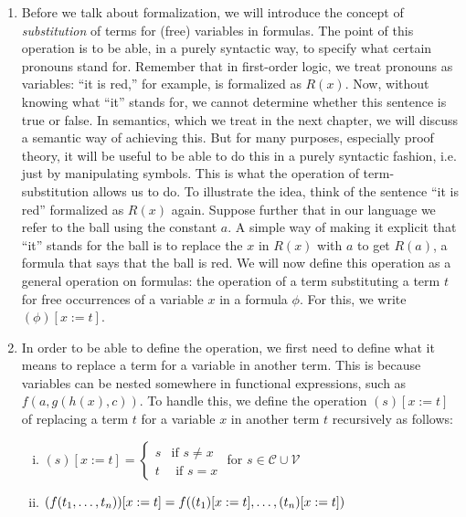 	\begin{enumerate}[\thesection.1]

		\item Before we talk about formalization, we will introduce the concept of \emph{substitution} of terms for (free) variables in formulas. The point of this operation is to be able, in a purely syntactic way, to specify what certain pronouns stand for. Remember that in first-order logic, we treat pronouns as variables: ``it is red,'' for example, is formalized as $R(x)$. Now, without knowing what ``it'' stands for, we cannot determine whether this sentence is true or false. In semantics, which we treat in the next chapter, we will discuss a semantic way of achieving this. But for many purposes, especially proof theory, it will be useful to be able to do this in a purely syntactic fashion, i.e. just by manipulating symbols. This is what the operation of term-substitution allows us to do. To illustrate the idea, think of the sentence ``it is red'' formalized as $R(x)$ again. Suppose further that in our language we refer to the ball using the constant $a$. A simple way of making it explicit that ``it'' stands for the ball is to replace the $x$ in $R(x)$ with $a$ to get $R(a)$, a formula that says that the ball is red. We will now define this operation as a general operation on formulas: the operation of a term substituting a term $t$ for free occurrences of a variable $x$ in a formula $\phi$. For this, we write $(\phi)[x:=t]$.
			
		\item In order to be able to define the operation, we first need to define what it means to replace a term for a variable in another term. This is because variables can be nested somewhere in functional expressions, such as $f(a, g(h(x),c))$. To handle this, we define the operation $(s)[x:=t]$ of replacing a term $t$ for a variable $x$ in another term $t$ recursively as follows:
		
			\begin{enumerate}[(i)]
			
				\item $(s)[x:=t]=\begin{cases} s & \text{if } s\neq x\\ t & \text{ if }s=x\end{cases}$ for $s\in \mathcal{C}\cup\mathcal{V}$
				
				\item $(f(t_1,\mathellipsis, t_n))[x:=t]=f((t_1)[x:=t], \mathellipsis, (t_n)[x:=t])$
			

\end{enumerate}
\end{enumerate}
